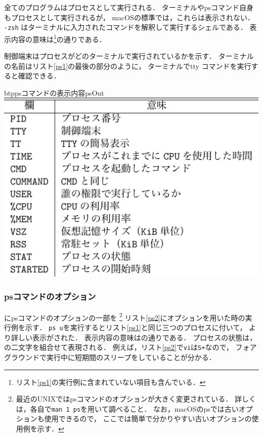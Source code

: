

全てのプログラムはプロセスとして実行される．
ターミナルやpsコマンド自身もプロセスとして実行されるが，
macOSの標準では，これらは表示されない．
\texttt{-zsh} はターミナルに入力されたコマンドを解釈して実行するシェルである．
表示内容の意味は\footnote{
リスト\ref{ps1}の実行例に含まれていない項目も含んでいる．}の通りである．

制御端末はプロセスがどのターミナルで実行されているかを示す．
ターミナルの名前はリスト\ref{ps1}の最後の部分のように，
ターミナルでtty コマンドを実行すると確認できる．

%

\begin{mytable}{btp}{psコマンドの表示内容}{psOut}
  \includegraphics[scale=1.0]{Tbl/psOut.pdf}
\end{mytable}

\subsubsection{psコマンドのオプション}
にpsコマンドのオプションの一部を
\footnote{
最近のUNIXではpsコマンドのオプションが大きく変更されている．
詳しくは，各自で\texttt{man 1 ps}を用いて調べること．
なお，macOSのpsでは古いオプションも使用できるので，
ここでは簡単で分かりやすい古いオプションの使用例を示す．
}
リスト\ref{ps2}にオプションを用いた時の実行例を示す．
\texttt{ps u}を実行するとリスト\ref{ps1}と同じ三つのプロセスに付いて，
より詳しい表示がされた．
表示内容の意味はの通りである．
プロセスの状態は，の二文字を組合せて表現される．
例えば，リスト\ref{ps2}で\texttt{vi}は\texttt{S+}なので，
フォアグラウンドで実行中に短期間のスリープをしていることが分かる．

